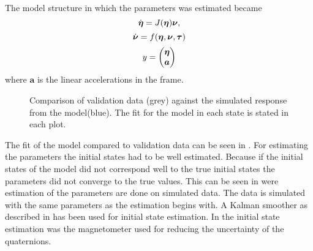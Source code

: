 The model structure in which the parameters was estimated became 
\begin{equation}
\dot{\boldsymbol{\eta}} = J(\boldsymbol{\eta}) \boldsymbol{\nu},
\end{equation}
\begin{equation}
\dot{\boldsymbol{\nu}} =  f(\boldsymbol{\eta}, \boldsymbol{\nu}, \boldsymbol{\tau})
\end{equation}
\begin{equation}
y = \begin{pmatrix}
\boldsymbol{\eta} \\
\boldsymbol{a}
\end{pmatrix}
\end{equation}
where $\boldsymbol{a}$ is the linear accelerations in the \abbrROV frame. 
\begin{figure}[tbp]
  \centering
  \qquad
  \qquad
    \qquad
    \qquad
    \qquad
  \caption{\label{fig:angVelCompare}%
    Comparison of validation data (grey) against the simulated response from the model(blue). The fit for the model in each state is stated in each plot.}
\end{figure}
The fit of the model compared to validation data can be seen in . For estimating the parameters the initial states had to be well estimated. Because if the initial states of the model did not correspond well to the true initial states the parameters did not converge to the true values. This can be seen in  were estimation of the parameters are done on simulated data. The data is simulated with the same parameters as the estimation begins with. A Kalman smoother as described in \citet{Wallin} has been used for initial state estimation. In the initial state estimation was the magnetometer used for reducing the uncertainty of the quaternions.

